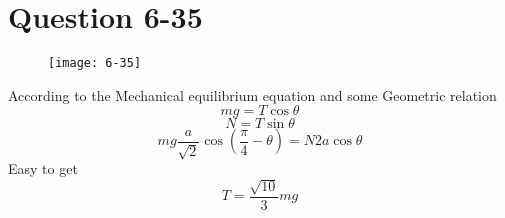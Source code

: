 \documentclass[12pt,a4paper]{article}%
\begin{document}
	\section{Question 6-35}
	\begin{figure}[H]
		\centering
		\texttt{[image: 6-35]}
		\caption*{}
		\label{fig:6-35}
	\end{figure}
	\noindent According to the Mechanical equilibrium equation and some Geometric relation
	\begin{equation}
		mg=T\cos\theta
	\end{equation}
	\begin{equation}
		N=T\sin\theta
	\end{equation}
	\begin{equation}
		mg\frac{a}{\sqrt{2}}\cos(\frac{\pi}{4}-\theta)=N2a\cos\theta
	\end{equation}
	Easy to get
	$$
	T=\frac{\sqrt{10}}{3}mg
	$$
\end{document}
